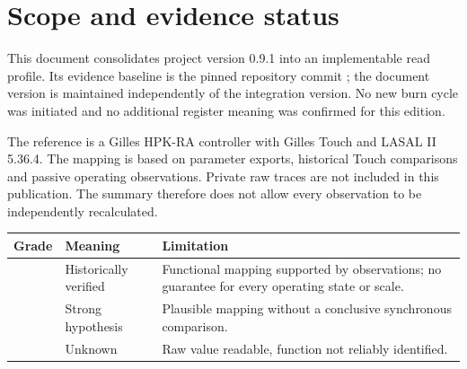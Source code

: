 \documentclass[10pt,a4paper]{article}
\begin{document}

\tableofcontents
\vspace{5mm}

\clearpage
\section{Scope and evidence status}
This document consolidates project version 0.9.1 into an implementable read profile. Its evidence baseline is the pinned repository commit ; the document version is maintained independently of the integration version. No new burn cycle was initiated and no additional register meaning was confirmed for this edition.

The reference is a Gilles HPK-RA controller with Gilles Touch and LASAL II 5.36.4. The mapping is based on parameter exports, historical Touch comparisons and passive operating observations. Private raw traces are not included in this publication. The summary therefore does not allow every observation to be independently recalculated.

\par\noindent\begin{tabularx}{\linewidth}{@{}L{12mm}L{36mm}X@{}}
\toprule
\textbf{Grade} & \textbf{Meaning} & \textbf{Limitation}\\\midrule
{} & Historically verified & Functional mapping supported by observations; no guarantee for every operating state or scale.\\
 & Strong hypothesis & Plausible mapping without a conclusive synchronous comparison.\\
 & Unknown & Raw value readable, function not reliably identified.\\\bottomrule
\end{tabularx}\par
\end{document}
